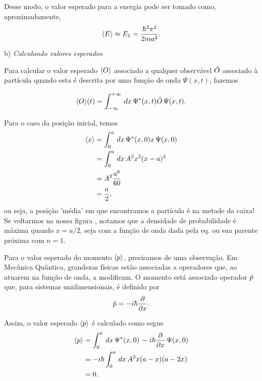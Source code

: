 \documentclass[red]{mecanica_quantica}
\begin{document}
Desse modo, o valor esperado para a energia pode ser tomado como, aproximadamente,
	\begin{equation}
	\label{eq:Eapprox}
	\langle E\rangle \approx E_1 = \frac{\hbar^2 \pi^2}{2m a^2}.
	\end{equation}

	
	b) \emph{Calculando valores esperados}
	
	Para calcular o valor esperado $\langle O\rangle$ associado a qualquer observável $\hat{O}$ associado à partícula quando esta é descrita por uma função de onda $\Psi(x,t)$, 
	fazemos
	
	\begin{equation}
	\label{eq:calcvaloresperado}
		\langle O\rangle(t) = \int_{-\infty}^{+\infty} \, dx \,  \Psi^*(x,t) \hat{O} \,  \Psi(x,t)
		.
	\end{equation}


	Para o caso da posição inicial, temos
	\begin{align}
	\label{eq:x0esp}
		\langle x\rangle & = \int_{0}^{a} \, dx \,  \Psi^*(x,0) x \,  \Psi(x,0) \nonumber \\
		& = \int_{0}^{a} \, dx \,  A^2 x^3 (x-a)^2 \nonumber \\
		& = A^2 \frac{a^6}{60} \nonumber \\
		& = \frac{a}{2},
	\end{align}
	ou seja, a posição 'média' em que encontramos a partícula é na metade da caixa!
	Se voltarmos na nossa figura , notamos que a densidade de probabilidade é máxima quando $x=a/2$, seja com a função de onda dada pela eq.  ou sua parente próxima  com $n=1$.
	
	Para o valor esperado do momento $\langle p\rangle$, precisamos de uma observação. Em Mecânica Quântica, grandezas físicas estão associadas a operadores que, ao atuarem na função de onda, a modificam. O momento está associado operador $\hat{p}$ que, para sistemas unidimensionais, é definido por 
	\begin{equation}
		\label{eq:operadorp}
		\hat{p} = -i\hbar \frac{\partial}{\partial x}.
	 \end{equation} 
	 
	 Assim, o valor esperado $\langle p\rangle$ é calculado como segue
	 \begin{align}
	 \label{eq:p0esp}
	 	\langle p\rangle & = \int_{0}^{a} \, dx \,  \Psi^*(x,0) \, -i\hbar \frac{\partial}{\partial x} \,  \Psi(x,0) \nonumber \\
	 	& = -i\hbar \int_{0}^{a} \, dx \, A^2 x(a-x)(a-2x) \nonumber \\
	 	& = 0.
	 \end{align}
	 
\end{document}
